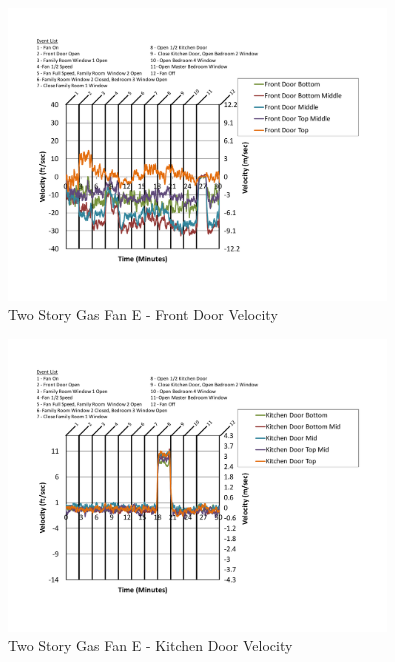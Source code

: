 \documentclass{article}
\begin{document}
\begin{appendices}
	\begin{figure}[H]
		\centering
		\includegraphics[height=3.05in,trim=0.67in 1.1in 0.67in 0.8in,clip=true]{0_Images/Results_Charts/ColdFlow/Two_Story/Gas/E/Front_Door_Velocity.pdf}
		\caption{Two Story Gas Fan E - Front Door Velocity}
	\end{figure}
 

	\begin{figure}[H]
		\centering
		\includegraphics[height=3.05in,trim=0.67in 1.1in 0.67in 0.8in,clip=true]{0_Images/Results_Charts/ColdFlow/Two_Story/Gas/E/Kitchen_Door_Velocity.pdf}
		\caption{Two Story Gas Fan E - Kitchen Door Velocity}
	\end{figure}
 
	\clearpage


\end{appendices}
\end{document}
